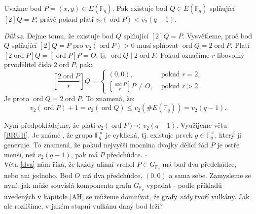 \documentclass[12pt]{report}
\DeclareMathOperator{\ord}{ord}
\begin{document}
\begin{veta}\label{jedna}
Uvažme bod $P=(x,y) \in E(\mathbb{F}_q)$. Pak existuje bod $Q \in E(\mathbb{F}_q)$ splňující $[2]Q = P$, právě pokud platí $v_2 (\ord P) < v_2 (q-1)$.
\end{veta}
\noindent \textit{Důkaz.} Dejme tomu, že existuje bod $Q$ splňující $[2]Q = P$. Vysvětleme, proč bod $Q$ splňující $[2]Q = P$ pro $v_2 (\ord P )> 0$ musí splňovat $\ord Q = 2 \ord P$. Platí $[2 \ord P] Q = [\ord P] P = O$, tj. $\ord Q \mid 2 \ord P$. Pokud označíme $r$ libovolný prvodělitel čísla $2 \ord P$, pak:
$$\left[\frac{2 \ord P}{r} \right] Q = \begin{cases}
(0,0), &\text{ pokud } r = 2,\\
\left[\frac{\ord P}{r}\right] P \neq O, &\text{ pokud } r > 2.
\end{cases}
$$  
Je proto $\ord Q = 2 \ord P$. To znamená, že:
$$v_2(\ord P) + 1 = v_2 (\ord Q) \leqslant v_2(\# E(\mathbb{F}_q)) = v_2 (q-1).$$ 

Nyní předpokládejme, že platí $v_2 (\ord P) < v_2 (q-1)$. Využijeme větu \ref{BRUH}. Je známé \cite[Ch.7 Thm. 1]{Ireland}, že grupa $\mathbb{F}_q ^{\times}$ je cyklická, tj. existuje prvek $g \in \mathbb{F}_q ^{\times}$, který ji generuje. To znamená, že pokud nejvyšší mocnina dvojky dělící řád $P$ je ostře menší, než $v_2(q-1)$, pak má $P$ předchůdce. \hfill $\square$\\






Věta \ref{dva} nám říká, že každý afinní vrchol $P \in G_{\mathbb{F}_q}$ má buď dva předchůdce, nebo ani jednoho. Bod $O$ má dva předchůdce, $(0,0)$ a sama sebe. Zamysleme se nyní, jak může souvislá komponenta grafu $G_{\mathbb{F}_q}$ vypadat - podle příkladů uvedených v kapitole \ref{AH} se můžeme domnívat, že grafy \textit{vždy} tvoří vulkány. Jak ale rozlišíme, v jakém stupni vulkánu daný bod leží?
\end{document}
